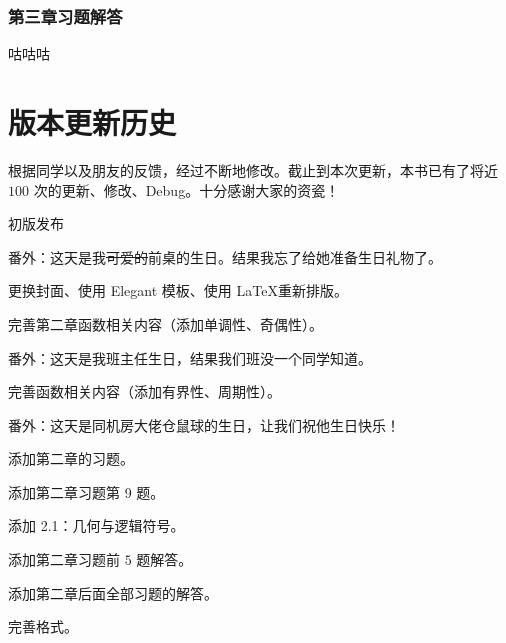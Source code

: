 \documentclass[lang=cn,10pt]{elegantbook}
\begin{document}
\subsection{第三章习题解答}
咕咕咕

\chapter{版本更新历史}

根据同学以及朋友的反馈，经过不断地修改。截止到本次更新，本书已有了将近 $100$ 次的更新、修改、Debug。十分感谢大家的资瓷！

\begin{change}
  \item 初版发布
\end{change}
番外：这天是我\sout{可爱的}前桌的生日。结果我忘了给她准备生日礼物了。

\begin{change}
  \item 更换封面、使用 Elegant 模板、使用 \LaTeX 重新排版。
  \item 完善第二章函数相关内容（添加单调性、奇偶性）。
\end{change}
番外：这天是我班主任生日，结果我们班没一个同学知道。

\begin{change}
  \item 完善函数相关内容（添加有界性、周期性）。
\end{change}
番外：这天是同机房大佬仓鼠球的生日，让我们祝他生日快乐！

\begin{change}
  \item 添加第二章的习题。
\end{change}

\begin{change}
  \item 添加第二章习题第 9 题。
  \item 添加 2.1：几何与逻辑符号。
\end{change}

\begin{change}
  \item 添加第二章习题前 $5$ 题解答。
\end{change}

\begin{change}
  \item 添加第二章后面全部习题的解答。
  \item 完善格式。
\end{change}
\end{document}
